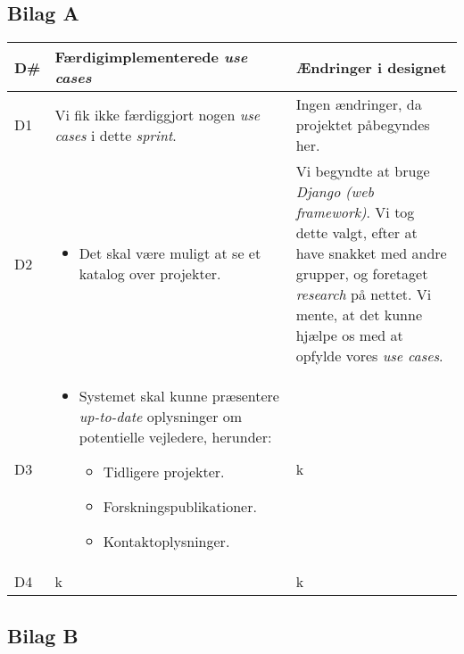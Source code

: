 \documentclass[12pt]{article}
\begin{document}
\subsection{Bilag A}
\label{sec:bilagA}
\begin{center}
	\begin{tabular}{|p{}|p{}|p{}|}
		\hline
	\textbf{D\#} & \textbf{Færdigimplementerede \textit{use cases}} & \textbf{Ændringer i designet} \\ \hline

	D1 & Vi fik ikke færdiggjort nogen \textit{use cases} i dette \textit{sprint}. & Ingen ændringer, da projektet påbegyndes her. \\ \hline

	D2 & 		\begin{minipage}[t]{0.4\textwidth}
	\begin{itemize}
		\item Det skal være muligt at se et katalog over projekter.
		\end{itemize}
		\end{minipage} & Vi begyndte at bruge \textit{Django (web framework)}. Vi tog dette valgt, efter at have snakket med andre grupper, og foretaget \textit{research} på nettet. Vi mente, at det kunne hjælpe os med at opfylde vores \textit{use cases}. \\ \hline

	D3 &
	\begin{minipage}[t]{0.4\textwidth}
	\begin{itemize}
		\item Systemet skal kunne præsentere \textit{up-to-date} oplysninger om potentielle vejledere, herunder:
		\begin{itemize}
			\item Tidligere projekter.
			\item Forskningspublikationer.
			\item Kontaktoplysninger.
		\end{itemize}
	\end{itemize}
	\end{minipage} & k \\
		\hline
	D4 & k & k \\ \hline
	\end{tabular}
\end{center}


\subsection{Bilag B}
\label{sec:bilagB}
\end{document}
